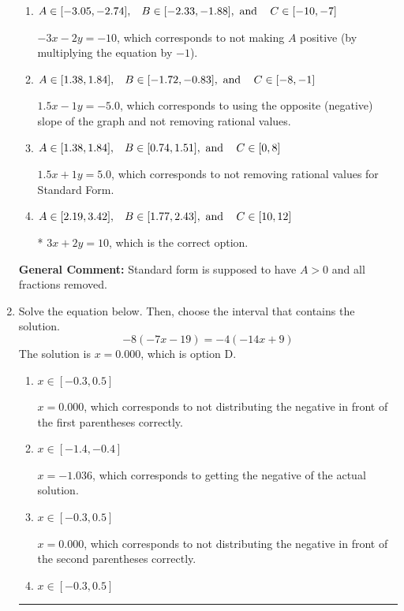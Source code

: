 \documentclass{extbook}[14pt]
\newcommand{\litem}[1]{\item #1

\rule{\textwidth}{0.4pt}}
\begin{document}
\begin{enumerate}
{\begin{enumerate}[label=\Alph*.]
 $3x - 2y = -10$, which corresponds to using the opposite (negative) slope of the graph, but did everything else correctly.
\item \( A \in [-3.05, -2.74], \hspace{3mm} B \in [-2.33, -1.88], \text{ and } \hspace{3mm} C \in [-10, -7] \)

 $-3x - 2y = -10$, which corresponds to not making $A$ positive (by multiplying the equation by $-1$).
\item \( A \in [1.38, 1.84], \hspace{3mm} B \in [-1.72, -0.83], \text{ and } \hspace{3mm} C \in [-8, -1] \)

 $1.5x - 1y = -5.0$, which corresponds to using the opposite (negative) slope of the graph and not removing rational values.
\item \( A \in [1.38, 1.84], \hspace{3mm} B \in [0.74, 1.51], \text{ and } \hspace{3mm} C \in [0, 8] \)

 $1.5x + 1y = 5.0$, which corresponds to not removing rational values for Standard Form.
\item \( A \in [2.19, 3.42], \hspace{3mm} B \in [1.77, 2.43], \text{ and } \hspace{3mm} C \in [10, 12] \)

* $3x + 2y = 10$, which is the correct option.
\end{enumerate}

\textbf{General Comment:} Standard form is supposed to have $A > 0$ and all fractions removed.
}
\litem{
Solve the equation below. Then, choose the interval that contains the solution.
\[ -8(-7x -19) = -4(-14x + 9) \]The solution is \( x = 0.000 \), which is option D.\begin{enumerate}[label=\Alph*.]
\item \( x \in [-0.3, 0.5] \)

$x = 0.000$, which corresponds to not distributing the negative in front of the first parentheses correctly.
\item \( x \in [-1.4, -0.4] \)

$x = -1.036$, which corresponds to getting the negative of the actual solution.
\item \( x \in [-0.3, 0.5] \)

$x = 0.000$, which corresponds to not distributing the negative in front of the second parentheses correctly.
\item \( x \in [-0.3, 0.5] \)


\end{enumerate}}
\end{enumerate}
\end{document}
